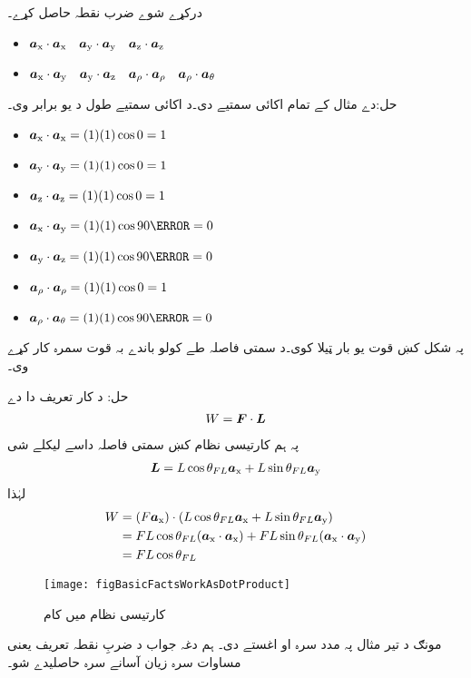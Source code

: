 درکړے شوے ضرب نقطہ حاصل کړے۔

\begin{itemize}
\item
$\ax \cdot \ax \quad \ay \cdot \ay \quad \az \cdot \az$\\
\item
$\ax \cdot \ay \quad \ay \cdot \az \quad \arho \cdot \arho \quad \arho \cdot \atheta$
\end{itemize}

حل:دے مثال کے تمام اکائی سمتیے دی۔د اکائی سمتیے طول د یو برابر وی۔
\begin{itemize}
\item
$\ax \cdot \ax =(1) (1) \cos 0=1$\\
\item
$\ay \cdot \ay =(1) (1) \cos 0=1$\\
\item
$\az \cdot \az =(1) (1) \cos 0=1$\\
\item
$\ax \cdot \ay =(1) (1) \cos 90\degree=0$\\
\item
$\ay \cdot \az =(1) (1) \cos 90\degree=0$\\
\item
$\arho \cdot \arho =(1) (1) \cos 0=1$\\
\item
$\arho \cdot \atheta =(1) (1) \cos 90\degree=0$\\
\end{itemize}
%
پہ شکل   کښ قوت  یو بار ټیلا کوی۔د سمتی فاصلہ   طے  کولو باندے بہ قوت سمرہ کار کړے وی۔

	حل:
	د کار    تعریف دا دے
\begin{align}
W=\kvec{F} \cdot \kvec{L}
\end{align}
پہ ہم کارتیسی نظام کښ سمتی فاصلہ داسے لیکلے شی
\begin{align}
\kvec{L}=L \cos \theta_{FL} \ax +L \sin \theta_{FL} \ay
\end{align}
لہٰذا
\begin{gather}
\begin{aligned}
W &= (F \ax) \cdot (L \cos \theta_{FL} \ax +L \sin \theta_{FL} \ay)\\
&=F L \cos \theta_{FL} (\ax \cdot \ax)+ F L \sin \theta_{FL} (\ax \cdot \ay)\\
&= F L \cos \theta_{FL}
\end{aligned}
\end{gather}
%
\begin{figure}
\centering
\texttt{[image: figBasicFactsWorkAsDotProduct]}
\caption{کارتیسی نظام میں کام}
\label{شکل_حقائق_کارتیسی_کام}
\end{figure}
مونګ د تیر مثال پہ مدد سرہ   او  اغستے دی۔ ہم دغہ جواب د  ضربِ نقطہ  تعریف یعنی مساوات  سرہ زیان آسانے سرہ حاصلیدے شو۔

